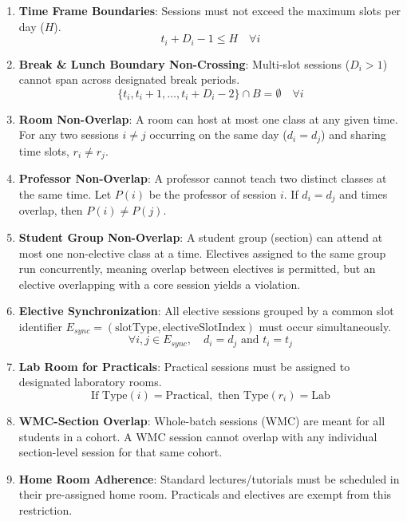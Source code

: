 \documentclass[11pt, a4paper]{article}
\begin{document}
\begin{enumerate}
    \item \textbf{Time Frame Boundaries}: Sessions must not exceed the maximum slots per day ($H$).
    \[ t_i + D_i - 1 \le H \quad \forall i \]
    
    \item \textbf{Break \& Lunch Boundary Non-Crossing}: Multi-slot sessions ($D_i > 1$) cannot span across designated break periods.
    \[ \{t_i, t_i+1, \dots, t_i + D_i - 2\} \cap B = \emptyset \quad \forall i \]

    \item \textbf{Room Non-Overlap}: A room can host at most one class at any given time. For any two sessions $i \neq j$ occurring on the same day ($d_i = d_j$) and sharing time slots, $r_i \neq r_j$.

    \item \textbf{Professor Non-Overlap}: A professor cannot teach two distinct classes at the same time. Let $P(i)$ be the professor of session $i$. If $d_i = d_j$ and times overlap, then $P(i) \neq P(j)$.

    \item \textbf{Student Group Non-Overlap}: A student group (section) can attend at most one non-elective class at a time. Electives assigned to the same group run concurrently, meaning overlap between electives is permitted, but an elective overlapping with a core session yields a violation.

    \item \textbf{Elective Synchronization}: All elective sessions grouped by a common slot identifier $E_{sync} = (\text{slotType}, \text{electiveSlotIndex})$ must occur simultaneously.
    \[ \forall i, j \in E_{sync}, \quad d_i = d_j \text{ and } t_i = t_j \]

    \item \textbf{Lab Room for Practicals}: Practical sessions must be assigned to designated laboratory rooms.
    \[ \text{If Type}(i) = \text{Practical}, \text{ then Type}(r_i) = \text{Lab} \]

    \item \textbf{WMC-Section Overlap}: Whole-batch sessions (WMC) are meant for all students in a cohort. A WMC session cannot overlap with any individual section-level session for that same cohort.

    \item \textbf{Home Room Adherence}: Standard lectures/tutorials must be scheduled in their pre-assigned home room. Practicals and electives are exempt from this restriction.
\end{enumerate}
\end{document}
